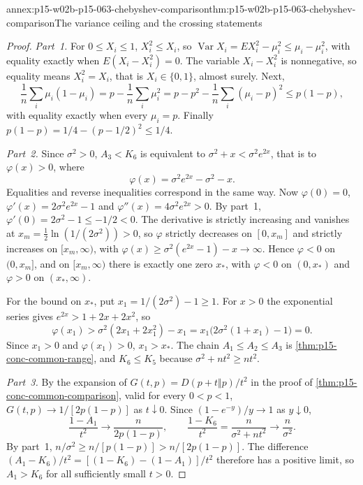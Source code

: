 \begin{annexitem}{annex:p15-w02b-p15-063-chebyshev-comparison}{thm:p15-w02b-p15-063-chebyshev-comparison}{The variance ceiling and the crossing statements}
\begin{proof}
\emph{Part~1.} For \(0\leq X_i\leq1\), \(X_i^2\leq X_i\), so
\(\operatorname{Var}X_i=EX_i^2-\mu_i^2\leq\mu_i-\mu_i^2\), with equality
exactly when \(E(X_i-X_i^2)=0\). The variable \(X_i-X_i^2\) is nonnegative,
so equality means \(X_i^2=X_i\), that is \(X_i\in\{0,1\}\), almost surely.
Next,
\[
 \frac1n\sum_i\mu_i(1-\mu_i)=p-\frac1n\sum_i\mu_i^2
   =p-p^2-\frac1n\sum_i(\mu_i-p)^2\leq p(1-p),
\]
with equality exactly when every \(\mu_i=p\). Finally
\(p(1-p)=1/4-(p-1/2)^2\leq1/4\).

\emph{Part~2.} Since \(\sigma^2>0\), \(A_3<K_6\) is equivalent to
\(\sigma^2+x<\sigma^2e^{2x}\), that is to \(\varphi(x)>0\), where
\[
 \varphi(x)=\sigma^2e^{2x}-\sigma^2-x .
\]
Equalities and reverse inequalities correspond in the same way. Now
\(\varphi(0)=0\), \(\varphi'(x)=2\sigma^2e^{2x}-1\) and
\(\varphi''(x)=4\sigma^2e^{2x}>0\). By part~1, \(\varphi'(0)=2\sigma^2-1
\leq-1/2<0\). The derivative is strictly increasing and vanishes at
\(x_m=\tfrac12\ln(1/(2\sigma^2))>0\), so \(\varphi\) strictly decreases on
\([0,x_m]\) and strictly increases on \([x_m,\infty)\), with
\(\varphi(x)\geq\sigma^2(e^{2x}-1)-x\to\infty\). Hence \(\varphi<0\) on
\((0,x_m]\), and on \([x_m,\infty)\) there is exactly one zero \(x_*\),
with \(\varphi<0\) on \((0,x_*)\) and \(\varphi>0\) on \((x_*,\infty)\).

For the bound on \(x_*\), put \(x_1=1/(2\sigma^2)-1\geq1\). For \(x>0\)
the exponential series gives \(e^{2x}>1+2x+2x^2\), so
\[
 \varphi(x_1)>\sigma^2(2x_1+2x_1^2)-x_1
   =x_1\bigl(2\sigma^2(1+x_1)-1\bigr)=0 .
\]
Since \(x_1>0\) and \(\varphi(x_1)>0\), \(x_1>x_*\).
The chain \(A_1\leq A_2\leq A_3\) is \cref{thm:p15-conc-common-range},
and \(K_6\leq K_5\) because \(\sigma^2+nt^2\geq nt^2\).

\emph{Part~3.} By the expansion of \(G(t,p)=D(p+t\Vert p)/t^2\) in the
proof of \cref{thm:p15-conc-common-comparison}, valid for every
\(0<p<1\), \(G(t,p)\to1/[2p(1-p)]\) as \(t\downarrow0\). Since
\((1-e^{-y})/y\to1\) as \(y\downarrow0\),
\[
 \frac{1-A_1}{t^2}\longrightarrow\frac n{2p(1-p)},\qquad
 \frac{1-K_6}{t^2}=\frac n{\sigma^2+nt^2}\longrightarrow\frac n{\sigma^2}.
\]
By part~1, \(n/\sigma^2\geq n/[p(1-p)]>n/[2p(1-p)]\). The difference
\((A_1-K_6)/t^2=[(1-K_6)-(1-A_1)]/t^2\) therefore has a positive limit,
so \(A_1>K_6\) for all sufficiently small \(t>0\).


\end{proof}
\end{annexitem}
